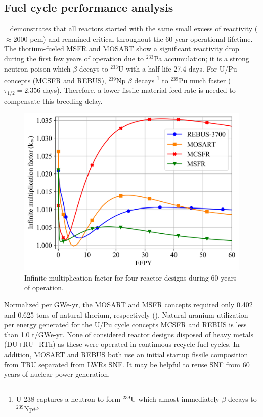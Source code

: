 \documentclass[letterpaper]{mandc2019}
\begin{document}
\subsection{Fuel cycle performance analysis}
\label{sec:performance}
~ demonstrates that all reactors started with the same small excess of reactivity ($\approx$2000 pcm) and remained critical throughout the 60-year operational lifetime. The thorium-fueled \gls{MSFR} and \gls{MOSART} show a significant reactivity drop during the first few years of operation due to $^{233}$Pa accumulation; it is a strong neutron poison which $\beta$ decays to $^{233}$U with a half-life 27.4 days. For U/Pu concepts (\gls{MCSFR} and REBUS), $^{239}$Np $\beta$ decays \footnote{U-238 captures a neutron to form $^{239}$U which almost immediately $\beta$ decays to $^{239}$Np} to $^{239}$Pu much faster ($\tau_{1/2}=2.356$ days). Therefore, a lower fissile material feed rate is needed to compensate this breeding delay.
\begin{figure}[!htb]
  \centering
  \includegraphics[scale=0.585]{./Figures/k_inf.png}
  \vspace{-0.25in}
  \caption{Infinite multiplication factor for four reactor designs during 60 years of operation.}
  \label{fig:k_inf}
\end{figure}

Normalized per GWe-yr, the \gls{MOSART} and \gls{MSFR} concepts required only 0.402 and 0.625 tons of natural thorium, respectively (). Natural uranium utilization per energy generated for the U/Pu cycle concepts \gls{MCSFR} and REBUS is less than 1.0 t/GWe-yr. None of considered reactor designs disposed of heavy metals (\gls{DU}+\gls{RU}+\gls{RTh}) as these were operated in continuous recycle fuel cycles.
In addition, \gls{MOSART} and REBUS both use an initial startup fissile composition from \gls{TRU} separated from \glspl{LWR} \gls{SNF}. It may be helpful to reuse \gls{SNF} from 60 years of nuclear power generation.
\end{document}
